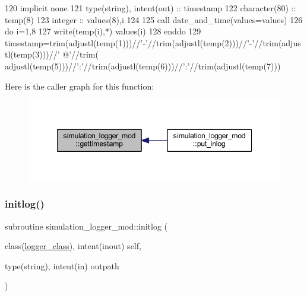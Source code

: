\begin{DoxyCode}
120     \textcolor{keywordtype}{implicit none}
121     \textcolor{keywordtype}{type}(string), \textcolor{keywordtype}{intent(out)} :: timestamp
122     \textcolor{keywordtype}{character(80)} :: temp(8)
123     \textcolor{keywordtype}{integer} :: values(8),i
124 
125     \textcolor{keyword}{call }date\_and\_time(values=values)
126     \textcolor{keywordflow}{do} i=1,8
127         \textcolor{keyword}{write}(temp(i),*) values(i)
128 \textcolor{keywordflow}{    enddo}
129     timestamp=trim(adjustl(temp(1)))//\textcolor{stringliteral}{'-'}//trim(adjustl(temp(2)))//\textcolor{stringliteral}{'-'}//trim(adjustl(temp(3)))//\textcolor{stringliteral}{' @'}//trim(
      adjustl(temp(5)))//\textcolor{stringliteral}{':'}//trim(adjustl(temp(6)))//\textcolor{stringliteral}{':'}//trim(adjustl(temp(7)))
\end{DoxyCode}
Here is the caller graph for this function\+:\nopagebreak
\begin{figure}[H]
\begin{center}
\leavevmode
\includegraphics[width=348pt]{namespacesimulation__logger__mod_a0326a5eeb649b041064a01d96aef0989_icgraph}
\end{center}
\end{figure}
\mbox{\label{namespacesimulation__logger__mod_abf603e657da9104a8060ab53c72f0aca}} 
\subsubsection{\texorpdfstring{initlog()}{initlog()}}
{\footnotesize\ttfamily subroutine simulation\+\_\+logger\+\_\+mod\+::initlog (\begin{DoxyParamCaption}\item[{class(\mbox{\hyperlink{structsimulation__logger__mod_1_1logger__class}{logger\+\_\+class}}), intent(inout)}]{self,  }\item[{type(string), intent(in)}]{outpath }\end{DoxyParamCaption})\hspace{0.3cm}{\ttfamily [private]}}



